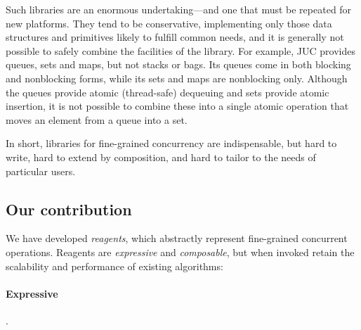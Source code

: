 \documentclass[preprint]{sigplanconf}
\begin{document}
Such libraries are an enormous undertaking---and one that must be repeated for
new platforms.  They tend to be conservative, implementing only those data
structures and primitives likely to fulfill common needs, and it is generally
not possible to safely combine the facilities of the library.  For example,
JUC provides queues, sets and maps, but not stacks or bags.  Its queues come
in both blocking and nonblocking forms, while its sets and maps are
nonblocking only.  Although the queues provide atomic (thread-safe) dequeuing
and sets provide atomic insertion, it is not possible to combine these into a
single atomic operation that moves an element from a queue into a set.

In short, libraries for fine-grained concurrency are indispensable, but hard
to write, hard to extend by composition, and hard to tailor to the needs of
particular users.

\subsection*{Our contribution}





We have developed \emph{reagents}, which abstractly represent fine-grained
concurrent operations.  Reagents are \emph{expressive} and \emph{composable},
but when invoked retain the scalability and performance of existing
algorithms:




\paragraph{Expressive}  .
\end{document}

